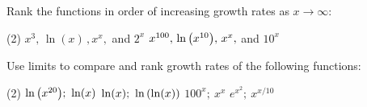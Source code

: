 \documentclass[answers]{exam}
\begin{document}
\vspace*{5pt}

\noindent
{}
\begin{ex*}
  Rank the functions in order of increasing growth rates as $x\to\infty$:
\end{ex*}
\begin{tasks}[after-item-skip=\stretch{1}, label=~](2)
  \task $x^3,\,\ln(x)\,,x^x,$ and $2^x$
  \task $x^{100},\,\ln{\left(x^{10}\right)},\,x^x,$ and $10^x$
\end{tasks}

\begin{ex*}
  Use limits to compare and rank growth rates of the following functions:
\end{ex*}
\begin{tasks}[after-item-skip=\stretch{1}, label=~](2)
  \task $\ln{\left(x^{20}\right)};\ \ln(x)$
  \task $\ln(x);\ \ln{\left(\ln(x)\right)}$
  \task $100^x;\ x^x$
  \task $e^{x^2};\ x^{x/10}$
\end{tasks}
\pagebreak
\end{document}
